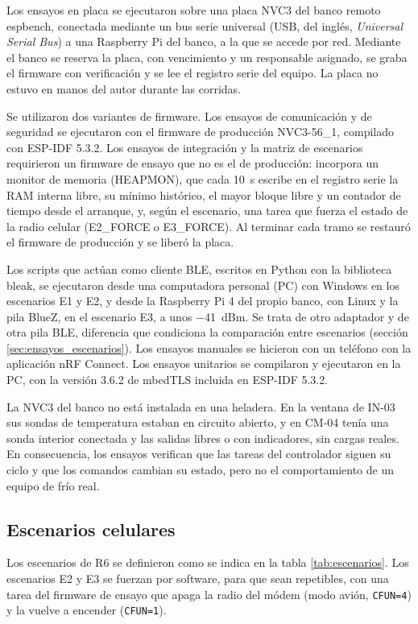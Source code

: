 Los ensayos en placa se ejecutaron sobre una placa NVC3 del banco remoto espbench, conectada mediante un bus serie universal (USB, del inglés, \textit{Universal Serial Bus}) a una Raspberry Pi del banco, a la que se accede por red. Mediante el banco se reserva la placa, con vencimiento y un responsable asignado, se graba el firmware con verificación y se lee el registro serie del equipo. La placa no estuvo en manos del autor durante las corridas.

Se utilizaron dos variantes de firmware. Los ensayos de comunicación y de seguridad se ejecutaron con el firmware de producción NVC3-56\_1, compilado con ESP-IDF 5.3.2. Los ensayos de integración y la matriz de escenarios requirieron un firmware de ensayo que no es el de producción: incorpora un monitor de memoria (HEAPMON), que cada 10~s escribe en el registro serie la RAM interna libre, su mínimo histórico, el mayor bloque libre y un contador de tiempo desde el arranque, y, según el escenario, una tarea que fuerza el estado de la radio celular (E2\_FORCE o E3\_FORCE). Al terminar cada tramo se restauró el firmware de producción y se liberó la placa.

Los scripts que actúan como cliente BLE, escritos en Python con la biblioteca bleak, se ejecutaron desde una computadora personal (PC) con Windows en los escenarios E1 y E2, y desde la Raspberry Pi 4 del propio banco, con Linux y la pila BlueZ, en el escenario E3, a unos $-$41~dBm. Se trata de otro adaptador y de otra pila BLE, diferencia que condiciona la comparación entre escenarios (sección \ref{sec:ensayos_escenarios}). Los ensayos manuales se hicieron con un teléfono con la aplicación nRF Connect. Los ensayos unitarios se compilaron y ejecutaron en la PC, con la versión 3.6.2 de mbedTLS incluida en ESP-IDF 5.3.2.

La NVC3 del banco no está instalada en una heladera. En la ventana de IN-03 sus sondas de temperatura estaban en circuito abierto, y en CM-04 tenía una sonda interior conectada y las salidas libres o con indicadores, sin cargas reales. En consecuencia, los ensayos verifican que las tareas del controlador siguen su ciclo y que los comandos cambian su estado, pero no el comportamiento de un equipo de frío real.

\subsection{Escenarios celulares}
\label{subsec:escenarios_celulares}

Los escenarios de R6 se definieron como se indica en la tabla \ref{tab:escenarios}. Los escenarios E2 y E3 se fuerzan por software, para que sean repetibles, con una tarea del firmware de ensayo que apaga la radio del módem (modo avión, \texttt{CFUN=4}) y la vuelve a encender (\texttt{CFUN=1}).

